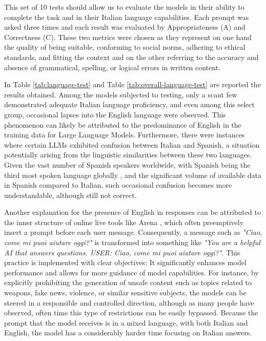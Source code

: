 This set of 10 tests should allow us to evaluate the models in their ability to complete the task and in their Italian language capabilities. Each prompt was asked three times and each result was evaluated by Appropriateness (A) and Correctness (C). These two metrics were chosen as they represent on one hand the quality of being suitable, conforming to social norms, adhering to ethical standards, and fitting the context and on the other referring to the accuracy and absence of grammatical, spelling, or logical errors in written content. 



In Table \ref{tab:language-test} and Table \ref{tab:overall-language-test} are reported the results obtained.
Among the models subjected to testing, only a scant few demonstrated adequate Italian language proficiency, and even among this select group, occasional lapses into the English language were observed. This phenomenon can likely be attributed to the predominance of English in the training data for Large Language Models. Furthermore, there were instances where certain LLMs exhibited confusion between Italian and Spanish, a situation potentially arising from the linguistic similarities between these two languages. Given the vast number of Spanish speakers worldwide, with Spanish being the third most spoken language globally \cite{}, and the significant volume of available data in Spanish compared to Italian, such occasional confusion becomes more understandable, although still not correct.

Another explanation for the presence of English in responses can be attributed to the inner structure of online live tools like Arena \cite{}, which often preemptively insert a prompt before each user message. Consequently, a message such as \emph{"Ciao, come mi puoi aiutare oggi?"} is transformed into something like \emph{"You are a helpful AI that answers questions. USER: Ciao, come mi puoi aiutare oggi?"}. This practice is implemented with clear objectives: It significantly enhances model performance and allows for more guidance of model capabilities. For instance, by explicitly prohibiting the generation of unsafe content such as topics related to weapons, fake news, violence, or similar sensitive subjects, the models can be steered in a responsible and controlled direction, although as many people have observed, often time this type of restrictions can be easily bypassed. Because the prompt that the model receives is in a mixed language, with both Italian and English, the model has a considerably harder time focusing on Italian answers.

